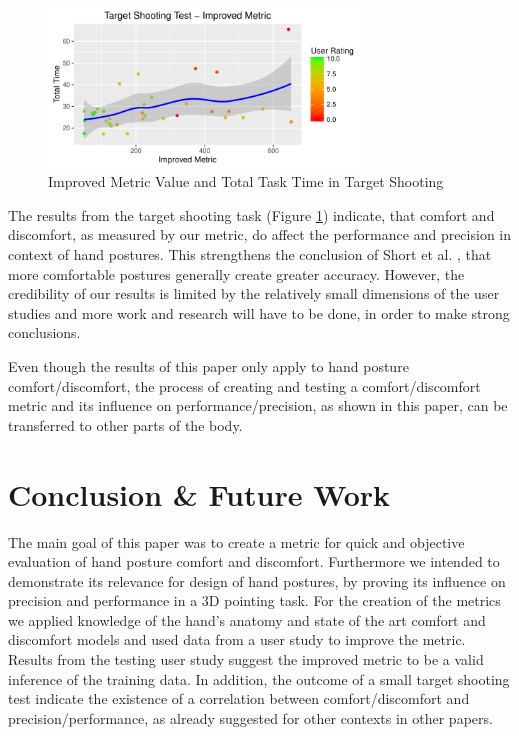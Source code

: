 \documentclass{sig-alternate-05-2015}
\begin{document}
\begin{figure}[h]
\centering
\includegraphics[width=8.45cm]{TargetShooting}
\vspace{-20pt}
\caption{Improved Metric Value and Total Task Time in Target Shooting}
\label{fig:targetShooting}
\vspace{-18pt}
\end{figure}

The results from the target shooting task (Figure \ref{fig:targetShooting}) indicate, that comfort and discomfort, as measured by our metric, do affect the performance and precision in context of hand postures. This strengthens the conclusion of Short et al. \cite{short1999precision}, that more comfortable postures generally create greater accuracy. However, the credibility of our results is limited by the relatively small dimensions of the user studies and more work and research will have to be done, in order to make strong conclusions.

Even though the results of this paper only apply to hand posture comfort/discomfort, the process of creating and testing a comfort/discomfort metric and its influence on performance/precision, as shown in this paper, can be transferred to other parts of the body. 

\section{Conclusion \& Future Work}

The main goal of this paper was to create a metric for quick and objective evaluation of hand posture comfort and discomfort. Furthermore we intended to demonstrate its relevance for design of hand postures, by proving its influence on precision and performance in a 3D pointing task. For the creation of the metrics we applied knowledge of the hand's anatomy and state of the art comfort and discomfort models and used data from a user study to improve the metric. Results from the testing user study suggest the improved metric to be a valid inference of the training data. In addition, the outcome of a small target shooting test indicate the existence of a correlation between comfort/discomfort and precision/performance, as already suggested for other contexts in other papers.
\end{document}
